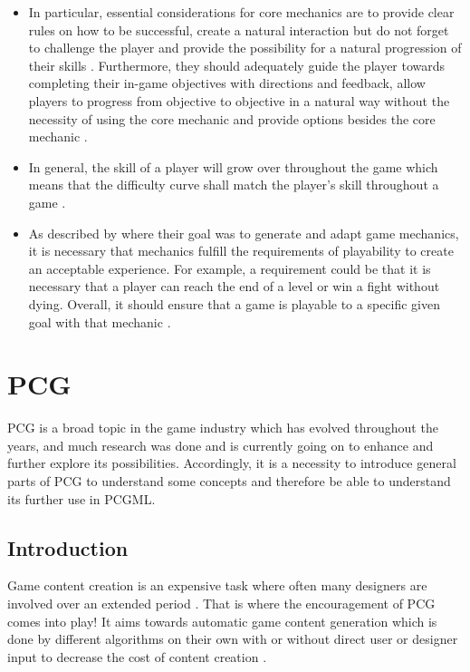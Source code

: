 \documentclass[MGS,Master,english]{twbook}%
\begin{document}
\begin{itemize}
	\item In particular, essential considerations for core mechanics are to provide clear rules on how to be successful, create a natural interaction but do not forget to challenge the player and provide the possibility for a natural progression of their skills \cite{mechanic::gamasutra::DanielDoan}. Furthermore, they should adequately guide the player towards completing their in-game objectives with directions and feedback, allow players to progress from objective to objective in a natural way without the necessity of using the core mechanic and provide options besides the core mechanic \cite{mechanic::gamasutra::DanielDoan}. 
	\item In general, the skill of a player will grow over throughout the game which means that the difficulty curve shall match the player's skill throughout a game \cite{mechanic::gamasutra::DanielDoan}. 
	\item As described by \citep{mechanic::generateAndAdaptingMechanics} where their goal was to generate and adapt game mechanics, it is necessary that mechanics fulfill the requirements of playability to create an acceptable experience. For example, a requirement could be that it is necessary that a player can reach the end of a level or win a fight without dying. Overall, it should ensure that a game is playable to a specific given goal with that mechanic \cite{mechanic::generateAndAdaptingMechanics}.
\end{itemize} 


%
%
\clearpage
\chapter{\acl{PCG}}
\ac{PCG} is a broad topic in the game industry which has evolved throughout the years, and much research was done and is currently going on to enhance and further explore its possibilities. Accordingly, it is a necessity to introduce general parts of PCG to understand some concepts and therefore be able to understand its further use in PCGML.

\section{Introduction}
Game content creation is an expensive task where often many designers are involved over an extended period \cite{pcg::PCGinGameIndustry}. That is where the encouragement of \ac{PCG} comes into play! It aims towards automatic game content generation which is done by different algorithms on their own with or without direct user or designer input to decrease the cost of content creation \cite{pcg::PCGinGameIndustry} \cite{pcg::whatIsPCG}.
\end{document}

